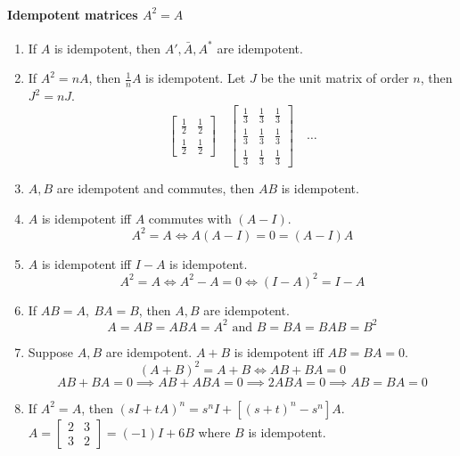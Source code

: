 \paragraph{Idempotent matrices $A^2 = A$}
\begin{enumerate}
	\item If $A$ is idempotent, then $A',\bar{A},A^\ast$ are idempotent.
	\item If $A^2 = nA$, then $\frac{1}{n}A$ is idempotent.
		\subitem Let $J$ be the unit matrix of order $n$, then $J^2 = nJ$.
	$$\begin{bmatrix}\frac{1}{2} & \frac{1}{2} \\ \frac{1}{2} & \frac{1}{2} \end{bmatrix} \quad \begin{bmatrix}\frac{1}{3} & \frac{1}{3} & \frac{1}{3} \\ \frac{1}{3} & \frac{1}{3} & \frac{1}{3} \\ \frac{1}{3} & \frac{1}{3} & \frac{1}{3} \end{bmatrix} \quad \dots $$
	\item $A,B$ are idempotent and commutes, then $AB$ is idempotent.
	\item $A$ is idempotent iff $A$ commutes with $(A-I)$.  $$A^2 = A \iff A(A-I)= 0 = (A-I)A$$
	\item $A$ is idempotent iff $I-A$ is idempotent.
		$$A^2 = A \iff A^2-A = 0 \iff (I-A)^2=I-A$$
	\item If $AB=A,\ BA=B$, then $A,B$ are idempotent.
		$$ A = AB = ABA = A^2 \text{ and } B = BA = BAB = B^2 $$
	\item Suppose $A,B$ are idempotent. $A+B$ is idempotent iff $AB=BA=0$.
		$$ (A+B)^2 = A+B \iff AB+BA = 0 $$
		$$ AB+BA = 0 \implies AB + ABA = 0 \implies 2ABA = 0 \implies AB = BA = 0$$
	\item If $A^2 = A$, then $(sI+tA)^n = s^nI + [(s+t)^n-s^n]A$.
		\subitem $ A = \begin{bmatrix} 2 & 3 \\ 3 & 2 \end{bmatrix} = (-1)I+6B $ where $B$ is idempotent.
\end{enumerate}

